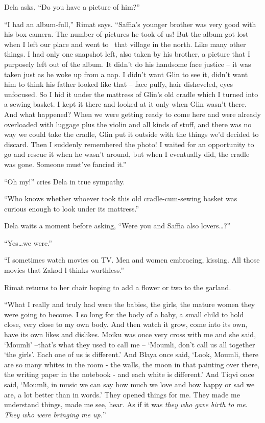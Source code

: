 \documentclass[twoside,11pt]{book}
\begin{document}
Dela asks, ``Do you have a picture of him?''

``I had an album-full,'' Rimat says. ``Saffia's younger brother was very good
with his box camera. The number of pictures he took of us! But the album got lost when I left our place and went to
\ that village in the north. Like many other things. I had only one snapshot left, also taken by his brother, a picture
that I purposely left out of the album. It didn't do his handsome face justice -- it was taken just as he woke up from
a nap. I didn't want Glin to see it, didn't want him to think his father looked like that -- face puffy, hair
disheveled, eyes unfocused. So I hid it under the mattress of Glin's old cradle which I turned into a sewing basket. I
kept it there and looked at it only when Glin wasn't there. And what happened? When we were getting ready to come here
and were already overloaded with luggage plus the violin and all kinds of stuff, and there was no way we could take the
cradle, Glin put it outside with the things we'd decided to discard. Then I suddenly remembered the photo! I waited for
an opportunity to go and rescue it when he wasn't around, but when I eventually did, the cradle was gone. Someone
must've fancied it.''

``Oh my!'' cries Dela in true sympathy.

``Who knows whether whoever took this old cradle-cum-sewing basket was curious enough to look under its
mattress.''

Dela waits a moment before asking, ``Were you and Saffia also lovers{\ldots}?''

``Yes{\dots}we were.''

``I sometimes watch movies on TV. Men and women embracing, kissing. All those movies that Zakod l thinks
worthless.''

Rimat returns to her chair hoping to add a flower or two to the garland.

``What I really and truly had were the babies, the girls, the mature women they were going to become. I so
long for the body of a baby, a small child to hold close, very close to my own body. And then watch it grow, come into
its own, have its own likes and dislikes. Moiku was once very cross with me and she said, `Moumli' --that's what they
used to call me -- `Moumli, don't call us all together `the girls'. Each one of us is different.' And Blaya once
said, `Look, Moumli, there are so many whites in the room - the walls, the moon in that painting over there, the
writing paper in the notebook - and each white is different.' And Tiqvi once said, `Moumli, in music we can say how
much we love and how happy or sad we are, a lot better than in words.' They opened things for me. They made me
understand things, made me see, hear. As if it was \textit{they} \textit{who gave birth to} \textit{me}. \textit{They
who were bringing me up.}''
\end{document}

